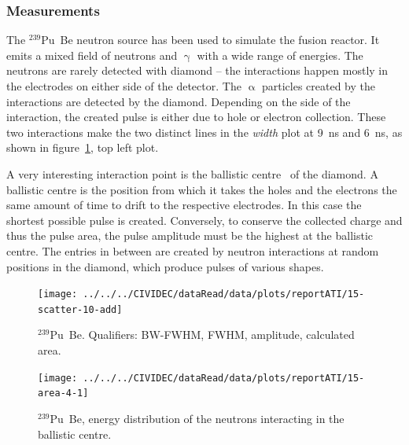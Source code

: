\subsubsection{Measurements}
The $^{239}$Pu~Be neutron source has been used to simulate the fusion reactor. It emits a mixed field of neutrons and $\upgamma$ with a wide range of energies. The neutrons are rarely detected with diamond -- the interactions happen mostly in the electrodes on either side of the detector. The $\upalpha$ particles created by the interactions are detected by the diamond. Depending on the side of the interaction, the created pulse is either due to hole or electron collection. These two interactions make the two distinct lines in the \emph{width} plot at 9~ns and 6~ns, as shown in figure~\ref{fig:scatterpu}, top left plot. 

A very interesting interaction point is the ballistic centre~\cite{PAVEL:00001, CHRISSI:00005} of the diamond. A ballistic centre is the position from which it takes the holes and the electrons the same amount of time to drift to the respective electrodes. In this case the shortest possible pulse is created. Conversely, to conserve the collected charge and thus the pulse area, the pulse amplitude must be the highest at the ballistic centre. The entries in between are created by neutron interactions at random positions in the diamond, which produce pulses of various shapes. 

\clearpage
\begin{figure}[]
\centering
\texttt{[image: ../../../CIVIDEC/dataRead/data/plots/reportATI/15-scatter-10-add]}
\caption{$^{239}$Pu~Be. Qualifiers: BW-FWHM, FWHM, amplitude, calculated area.}
\label{fig:scatterpu}
\end{figure}

\clearpage
\begin{figure}[!t]
\centering
\texttt{[image: ../../../CIVIDEC/dataRead/data/plots/reportATI/15-area-4-1]}
\caption{$^{239}$Pu~Be, energy distribution of the neutrons interacting in the ballistic centre.}
\label{fig:scatterpuarea}
\end{figure}

